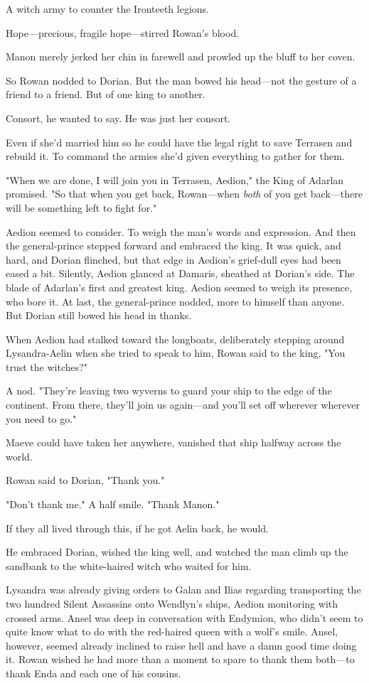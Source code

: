 A witch army to counter the Ironteeth legions.

Hope---precious, fragile hope---stirred Rowan's blood.

Manon merely jerked her chin in farewell and prowled up the bluff to her coven.

So Rowan nodded to Dorian. But the man bowed his head---not the gesture of a friend to a friend. But of one king to another.

Consort, he wanted to say. He was just her consort.

Even if she'd married him so he could have the legal right to save Terrasen and rebuild it. To command the armies she'd given everything to gather for them.

"When we are done, I will join you in Terrasen, Aedion," the King of Adarlan promised. "So that when you get back, Rowan---when \emph{both}
of you get back---there will be something left to fight for."

Aedion seemed to consider. To weigh the man's words and expression. And then the general-prince stepped forward and embraced the king. It was quick, and hard, and Dorian flinched, but that edge in Aedion's grief-dull eyes had been eased a bit. Silently, Aedion glanced at Damaris, sheathed at Dorian's side. The blade of Adarlan's first and greatest king. Aedion seemed to weigh its presence, who bore it. At last, the general-prince nodded, more to himself than anyone. But Dorian still bowed his head in thanks.

When Aedion had stalked toward the longboats, deliberately stepping around Lysandra-Aelin when she tried to speak to him, Rowan said to the king, "You trust the witches?"

A nod. "They're leaving two wyverns to guard your ship to the edge of the continent. From there, they'll join us again---and you'll set off wherever  wherever you need to go."

Maeve could have taken her anywhere, vanished that ship halfway across the world.

Rowan said to Dorian, "Thank you."

"Don't thank me." A half smile. "Thank Manon."

If they all lived through this, if he got Aelin back, he would.

He embraced Dorian, wished the king well, and watched the man climb up the sandbank to the white-haired witch who waited for him.

Lysandra was already giving orders to Galan and Ilias regarding transporting the two hundred Silent Assassins onto Wendlyn's ships, Aedion monitoring with crossed arms. Ansel was deep in conversation with Endymion, who didn't seem to quite know what to do with the red-haired queen with a wolf's smile. Ansel, however, seemed already inclined to raise hell and have a damn good time doing it. Rowan wished he had more than a moment to spare to thank them both---to thank Enda and each one of his cousins.


